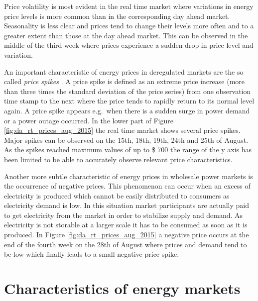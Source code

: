 Price volatility is most evident in the real time market where variations in energy price levels is more common than in the corresponding day ahead market. Seasonality is less clear and prices tend to change their levels more often and to a greater extent than those at the day ahead market. This can be observed in the middle of the third week where prices experience a sudden drop in price level and variation. 

An important characteristic of energy prices in deregulated markets are the so called \textit{price spikes} \cite{weron2004modelingmarkets}. A price spike is defined as an extreme price increase (more than three times the standard deviation of the price series) from one observation time stamp to the next where the price tends to rapidly return to its normal level again. 
A price spike appears e.g.~when there is a sudden surge in power demand or a power outage occurred. In the lower part of Figure \ref{fig:da_rt_prices_aug_2015} the real time market shows several price spikes. Major spikes can be observed on the 15th, 18th, 19th, 24th and 25th of August. As the spikes reached maximum values of up to \$ 700 the range of the y axis has been limited to be able to accurately observe relevant price characteristics. 

Another more subtle characteristic of energy prices in wholesale power markets is the occurrence of negative prices. This phenomenon can occur when an excess of electricity is produced which cannot be easily distributed to consumers as electricity demand is low. In this situation market participants are actually paid to get electricity from the market in order to stabilize supply and demand. As electricity is not storable at a larger scale it has to be consumed as soon as it is produced. 
In Figure \ref{fig:da_rt_prices_aug_2015} a negative price occurs at the end of the fourth week on the 28th of August where prices and demand tend to be low which finally leads to a small negative price spike. 







\section{Characteristics of energy markets} \label{sec:characteristics_of_energy_markets}

